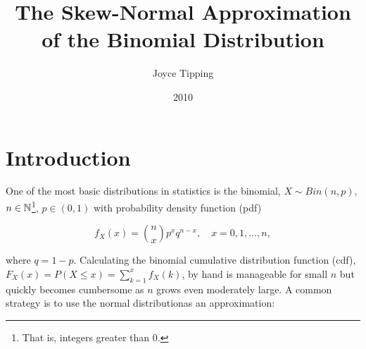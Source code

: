 \documentclass{article}
\begin{document}
\title{The Skew-Normal Approximation of the Binomial Distribution}
\author{Joyce Tipping}
\date{2010}
\maketitle

\section{Introduction}

One of the most basic distributions in statistics is the binomial, $X \sim
Bin(n,p)$, $n \in \mathbb{N}$\footnote{That is, integers greater than 0.}, $p \in (0,
1)$ with probability density function (pdf)

\begin{equation*}
  f_X(x) = \binom{n}{x} p^x q^{n-x}, \quad x = 0, 1, \ldots, n,
\end{equation*}

where $q=1-p$. Calculating the binomial cumulative distribution function (cdf),
$F_X(x) = P(X \leq x) = \sum_{k=1}^x f_X(k)$, by hand is manageable for small
$n$ but quickly becomes cumbersome as $n$ grows even moderately large. A common
strategy is to use the normal distribution\footnotemark as an approximation:


%
%
%
%
%
%
\end{document}
